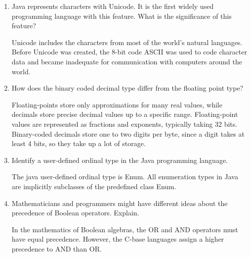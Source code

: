\begin{enumerate}
\begin{answer}
    \end{answer}

  \item Java represents characters with Unicode. It is the first
    widely used programming language with this feature. What is the
    significance of this feature?

  \begin{answer}

    Unicode includes the characters from most of the world's natural languages. Before Unicode was created, the 8-bit code ASCII was used to code character data and became inadequate for communication with computers around the world.

    \end{answer}

  \item How does the binary coded decimal type differ from the
    floating point type?

  \begin{answer}

    Floating-points store only approximations for many real values, while decimals store precise decimal values up to a specific range. Floating-point values are represented as fractions and exponents, typically taking 32 bits. Binary-coded decimals store one to two digits per byte, since a digit takes at least 4 bits, so they take up a lot of storage. 

    \end{answer}

  \item Identify a user-defined ordinal type in the Java programming
    language.

  \begin{answer}

    The java user-defined ordinal type is Enum. All enumeration types in Java are implicitly subclasses of the predefined class Enum.

    \end{answer}

  \item Mathematicians and programmers might have different ideas
    about the precedence of Boolean operators. Explain.

  \begin{answer}

    In the mathematics of Boolean algebras, the OR and AND operators must have equal precedence. However, the C-base languages assign a higher precedence to AND than OR. 


\end{answer}
\end{enumerate}
